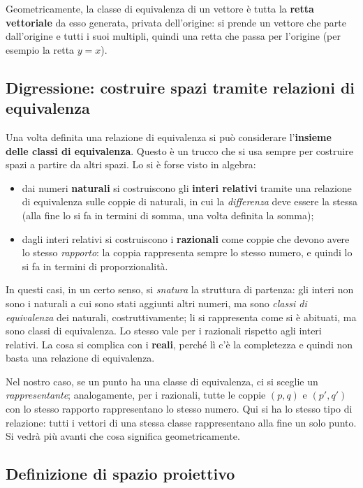 Geometricamente, la classe di equivalenza di un vettore è tutta la \textbf{retta vettoriale} da esso generata, privata dell'origine: si prende un vettore che parte dall'origine e tutti i suoi multipli, quindi una retta che passa per l'origine (per esempio la retta $y=x$).

\subsection{Digressione: costruire spazi tramite relazioni di equivalenza}

Una volta definita una relazione di equivalenza si può considerare l'\textbf{insieme delle classi di equivalenza}. Questo è un trucco che si usa sempre per costruire spazi a partire da altri spazi. Lo si è forse visto in algebra:
\begin{itemize}
  \item dai numeri \textbf{naturali} si costruiscono gli \textbf{interi relativi} tramite una relazione di equivalenza sulle coppie di naturali, in cui la \emph{differenza} deve essere la stessa (alla fine lo si fa in termini di somma, una volta definita la somma);
  \item dagli interi relativi si costruiscono i \textbf{razionali} come coppie che devono avere lo stesso \emph{rapporto}: la coppia rappresenta sempre lo stesso numero, e quindi lo si fa in termini di proporzionalità.
\end{itemize}
In questi casi, in un certo senso, si \emph{snatura} la struttura di partenza: gli interi non sono i naturali a cui sono stati aggiunti altri numeri, ma sono \emph{classi di equivalenza} dei naturali, costruttivamente; li si rappresenta come si è abituati, ma sono classi di equivalenza. Lo stesso vale per i razionali rispetto agli interi relativi. La cosa si complica con i \textbf{reali}, perché lì c'è la completezza e quindi non basta una relazione di equivalenza.

Nel nostro caso, se un punto ha una classe di equivalenza, ci si sceglie un \emph{rappresentante}; analogamente, per i razionali, tutte le coppie $(p,q)$ e $(p',q')$ con lo stesso rapporto rappresentano lo stesso numero. Qui si ha lo stesso tipo di relazione: tutti i vettori di una stessa classe rappresentano alla fine un solo punto. Si vedrà più avanti che cosa significa geometricamente.

\subsection{Definizione di spazio proiettivo}

